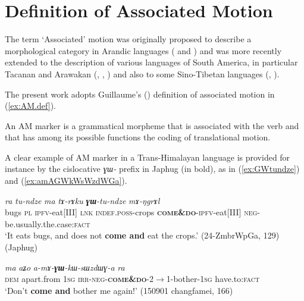 \documentclass[oneside,a4paper,11pt]{article}
\newcommand{\ipa}[1]{{\phon\textit{#1}}}
\newcommand{\rouge}[1]{\textbf{#1}}
\begin{document}
\section{Definition of Associated Motion}

The term `Associated' motion was originally proposed to describe a morphological category in Arandic languages (\citealt{koch84associated.motion} and \citealt{wilkins91associated.motion}) and was more recently extended to the description of various languages of South America, in particular Tacanan and Arawakan (\citealt{guillaume09mouv.assoc}, \citealt{rose15am}, \citealt{guillaume16am}) and also to some Sino-Tibetan languages (\citealt{jacques13harmonization}, \citealt{konnerth15cisloc}).

The present work adopts Guillaume's (\citeyear[13]{guillaume16am}) definition of associated motion in (\ref{ex:AM.def}).


\begin{exe}
\ex \label{ex:AM.def}
 \glt An AM marker is a grammatical morpheme that is associated with the verb and that has among its possible functions the coding of translational motion.
\end{exe}

A clear example of AM marker in a Trans-Himalayan language is provided for instance by the cislocative \ipa{ɣɯ-} prefix in Japhug (in bold), as in (\ref{ex:GWtundze}) and (\ref{ex:amAGWkWsWzdWGa}). 
 
\begin{exe}
\ex \label{ex:GWtundze}
 \gll  \ipa{qajɯ}   \ipa{ra}  \ipa{tu-ndze} \ipa{ma} \ipa{tɤ-rɤku}  \ipa{\rouge{ɣɯ}-tu-ndze} \ipa{mɤ-ŋgrɤl} \\
bugs \textsc{pl} \textsc{ipfv}-eat[III] \textsc{lnk} \textsc{indef}.\textsc{poss}-crops   \textsc{\rouge{come\&do}}-\textsc{ipfv}-eat[III] \textsc{neg}-be.usually.the.case:\textsc{fact} \\
\glt `It eats bugs, and does not \rouge{come and} eat the crops.' (24-ZmbrWpGa, 129) (Japhug)
\end{exe}

\begin{exe}
\ex \label{ex:amAGWkWsWzdWGa}
 \gll     \ipa{nɯ}   \ipa{ma}   \ipa{aʑo}   \ipa{a-mɤ-\rouge{ɣɯ}-kɯ-sɯzdɯɣ-a}   \ipa{ra} \\
 \textsc{dem} apart.from \textsc{1sg} \textsc{irr}-\textsc{neg}-\textsc{\rouge{come\&do}}-2$\rightarrow$1-bother-\textsc{1sg} have.to:\textsc{fact} \\
 \glt `Don't \rouge{come and} bother me again!' (150901 changfamei, 166)
\end{exe}
\end{document}
